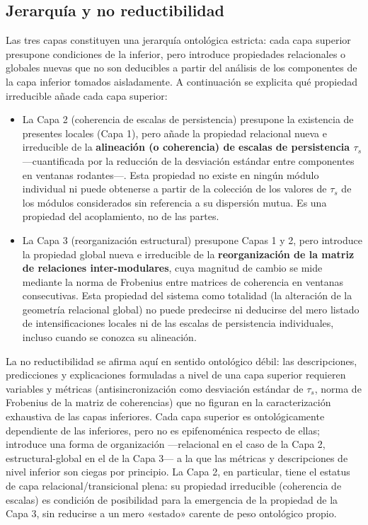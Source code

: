 \subsection{Jerarquía y no reductibilidad}

Las tres capas constituyen una jerarquía ontológica estricta: cada capa superior presupone condiciones de la inferior, pero introduce propiedades relacionales o globales nuevas que no son deducibles a partir del análisis de los componentes de la capa inferior tomados aisladamente. A continuación se explicita qué propiedad irreducible añade cada capa superior:

\begin{itemize}
    \item La Capa 2 (coherencia de escalas de persistencia) presupone la existencia de presentes locales (Capa 1), pero añade la propiedad relacional nueva e irreducible de la \textbf{alineación (o coherencia) de escalas de persistencia $\tau_s$} —cuantificada por la reducción de la desviación estándar entre componentes en ventanas rodantes—. Esta propiedad no existe en ningún módulo individual ni puede obtenerse a partir de la colección de los valores de $\tau_s$ de los módulos considerados sin referencia a su dispersión mutua. Es una propiedad del acoplamiento, no de las partes.
    \item La Capa 3 (reorganización estructural) presupone Capas 1 y 2, pero introduce la propiedad global nueva e irreducible de la \textbf{reorganización de la matriz de relaciones inter-modulares}, cuya magnitud de cambio se mide mediante la norma de Frobenius entre matrices de coherencia en ventanas consecutivas. Esta propiedad del sistema como totalidad (la alteración de la geometría relacional global) no puede predecirse ni deducirse del mero listado de intensificaciones locales ni de las escalas de persistencia individuales, incluso cuando se conozca su alineación.
\end{itemize}

La no reductibilidad se afirma aquí en sentido ontológico débil: las descripciones, predicciones y explicaciones formuladas a nivel de una capa superior requieren variables y métricas (antisincronización como desviación estándar de $\tau_s$, norma de Frobenius de la matriz de coherencias) que no figuran en la caracterización exhaustiva de las capas inferiores. Cada capa superior es ontológicamente dependiente de las inferiores, pero no es epifenoménica respecto de ellas; introduce una forma de organización —relacional en el caso de la Capa 2, estructural-global en el de la Capa 3— a la que las métricas y descripciones de nivel inferior son ciegas por principio. La Capa 2, en particular, tiene el estatus de capa relacional/transicional plena: su propiedad irreducible (coherencia de escalas) es condición de posibilidad para la emergencia de la propiedad de la Capa 3, sin reducirse a un mero «estado» carente de peso ontológico propio.

